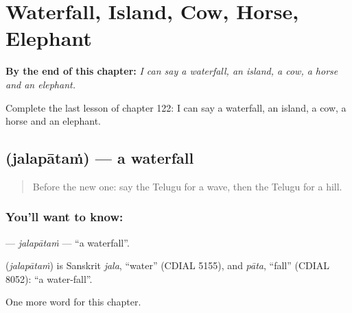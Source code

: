 
\chapter{Waterfall, Island, Cow, Horse, Elephant}
\label{ch:te-waterfall-island-cow-horse-elephant}

\begin{chapteropening}
\textbf{By the end of this chapter:} \emph{I can say a waterfall, an island, a cow, a horse and an elephant.}

Complete the last lesson of chapter 122: I can say a waterfall, an island, a cow, a horse and an elephant.
\end{chapteropening}

\section[\texorpdfstring{\te{జలపాతం} (jalapātaṁ)}{జలపాతం (jalapātaṁ)}]{ (jalapātaṁ) — a waterfall}

\label{lesson:TE-C122-jalapatam}



\begin{quote}
Before the new one: say the Telugu for a wave, then the Telugu for a hill.
\end{quote}

\subsection*{You'll want to know: }
\textbf{} — \emph{jalapātaṁ} — \textquotedblleft{}a waterfall\textquotedblright{}.

\begin{cousinweb}
\textbf{} (\emph{jalapātaṁ}) is Sanskrit \emph{jala}, \textquotedblleft{}water\textquotedblright{} (CDIAL 5155), and \emph{pāta}, \textquotedblleft{}fall\textquotedblright{} (CDIAL 8052): \textquotedblleft{}a water-fall\textquotedblright{}.
\end{cousinweb}

\begin{grammarlens}[title={What you've built}]
One more word for this chapter.
\end{grammarlens}

